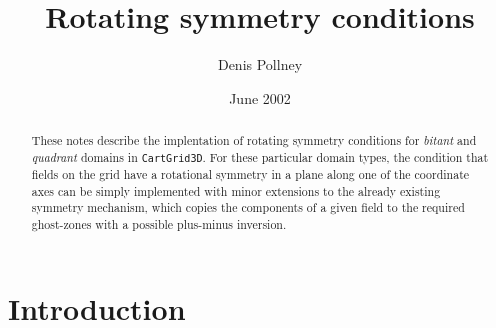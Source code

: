 \documentclass{article}
\begin{document}
\title{Rotating symmetry conditions}
\author{Denis Pollney}
\date{June 2002}

\maketitle

\begin{abstract}
These notes describe the implentation of rotating symmetry conditions
for \emph{bitant} and \emph{quadrant} domains in \texttt{CartGrid3D}.
For these particular domain types, the condition that fields on the
grid have a rotational symmetry in a plane along one of the
coordinate axes can be simply implemented with minor extensions to the
already existing symmetry mechanism, which copies the components of
a given field to the required ghost-zones with a possible plus-minus
inversion.
\end{abstract}

\section{Introduction}
\label{sec:rs_intro}
\end{document}
